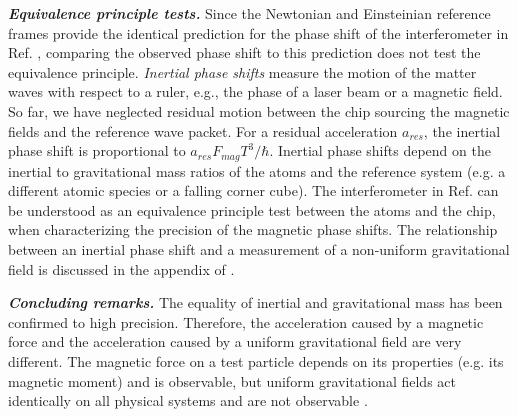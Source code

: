 \documentclass[aps,prl,reprint,onecolumn,nofootinbib,groupedaddress]{revtex4-2}
\begin{document}
\textit{\textbf{Equivalence principle tests.}}  Since the Newtonian and Einsteinian reference frames provide the identical prediction for the phase shift of the interferometer in Ref. \cite{dobkowski2025}, comparing the observed phase shift to this prediction does not test the equivalence principle.   
\textit{Inertial phase shifts} measure the motion of the matter waves with respect to a ruler, e.g., the phase of a laser beam or a magnetic field. So far, we have neglected residual motion between the chip sourcing the magnetic fields and the reference wave packet. For a residual acceleration $a_{res}$, the inertial phase shift is proportional to $a_{res} F_{mag}T^3/\hbar$. Inertial phase shifts depend on the inertial to gravitational mass ratios of the atoms and the reference system (e.g. a different atomic species or a falling corner cube). 
The interferometer in Ref. \cite{dobkowski2025}  can be understood as an equivalence principle test between the atoms and the chip, when characterizing the precision of the magnetic phase shifts. The relationship between an inertial phase shift and a measurement of a non-uniform gravitational field is discussed in the appendix of \cite{Asenbaum2024}.



\textit{\textbf{Concluding remarks.}} The equality of inertial and gravitational mass has been confirmed to high precision. Therefore, the acceleration caused by a magnetic force and the acceleration caused by a uniform gravitational field are very different.  The magnetic force on a test particle depends on its properties (e.g. its magnetic moment) and is observable, but uniform gravitational fields act identically on all physical systems and are not observable \cite{Asenbaum2024}. 
\end{document}
